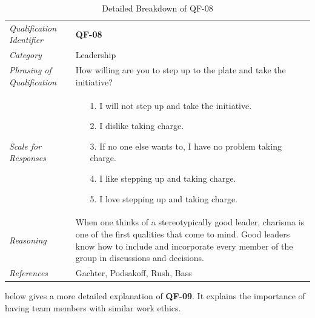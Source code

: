 \documentclass[12pt,letterpaper]{article}
\begin{document}
\begin{table}[H]
	\caption{Detailed Breakdown of QF-08}
	\begin{tabu} to 
		\toprule
		Qualification Identifier & {\bf QF-08}\\
		Category & Leadership \\
		Phrasing of Qualification & How willing are you to step up to the plate and take the initiative?\\
		Scale for Responses &
		\begin{minipage}[t]{\linewidth}
			\begin{enumerate}
				\item[1.] I will not step up and take the initiative.
				\item[2.] I dislike taking charge.
				\item[3.] If no one else wants to, I have no problem taking charge.
				\item[4.] I like stepping up and taking charge.
				\item[5.] I love stepping up and taking charge.
			\end{enumerate}
		\end{minipage}\\
		Reasoning & When one thinks of a stereotypically good leader, charisma is one of the first qualities that come to mind. Good leaders know how to include and incorporate every member of the group in discussions and decisions.\\
		References & Gachter\cite{gachter}, Podsakoff\cite{podsakoff}, Rush\cite{rush}, Bass\cite{bass}\\
		\toprule
	\end{tabu}
\end{table}

\newpage{}

 below gives a more detailed explanation of {\bf QF-09}. It explains the importance of having team members with similar work ethics.
\end{document}

